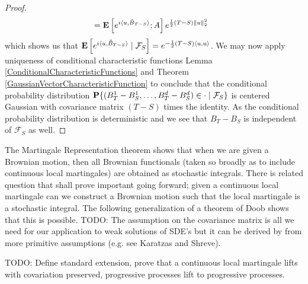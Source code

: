 \begin{proof}
\begin{align*}
&=  \expectation{ e^{i\langle u, \tilde{B}_{T-S} \rangle}; A} e^{\frac{1}{2}(T-S) \norm{u}_2^2}
\end{align*}
which shows us that $\cexpectationlong{\mathcal{F}_S}{e^{i \langle u, \tilde{B}_{T-S} \rangle}} = e^{-\frac{1}{2} (T-S) \langle u, u \rangle}$.  We may now apply uniqueness of conditional characteristic functions Lemma \ref{ConditionalCharacteristicFunctions} and Theorem \ref{GaussianVectorCharacteristicFunction} to conclude that the conditional probability distribution $\cprobability{\mathcal{F}_S}{ (B_{T}^1 - B_S^1,\dotsc, B_{T}^d - B_S^d) \in \cdot}$ is centered Gaussian with covariance matrix $(T-S)$ times the identity. As the conditional probability distribution is deterministic and we see that $B_T -B_S$ is independent of $\mathcal{F}_S$ as well.
\end{proof}

The Martingale Representation theorem shows that when we are given a Brownian motion, then all Brownian functionals (taken so broadly as to include continuous local martingales) are obtained as stochastic integrals.  There is related question that shall prove important going forward; given a continuous local martingale can we construct a Brownian motion such that the local martingale is a stochastic integral.  The following generalization of a theorem of Doob shows that this is possible.  TODO: The assumption on the covariance matrix is all we need for our application to weak solutions of SDE's but it can be derived by from more primitive assumptions (e.g. see Karatzas and Shreve).

TODO: Define standard extension, prove that a continuous local martingale lifts with covariation preserved, progressive processes lift to progressive processes.

